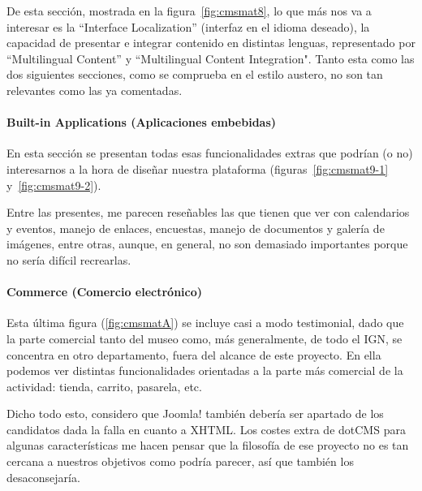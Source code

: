 \par De esta sección, mostrada en la figura~\ref{fig:cmsmat8}, lo que más nos va a interesar es la ``Interface Localization'' (interfaz en el idioma deseado), la capacidad de presentar e integrar contenido en distintas lenguas, representado por ``Multilingual Content'' y ``Multilingual Content Integration". Tanto esta como las dos siguientes secciones, como se comprueba en el estilo austero, no son tan relevantes como las ya comentadas.



\paragraph{Built-in Applications (Aplicaciones embebidas)}


\par En esta sección se presentan todas esas funcionalidades extras que podrían (o no) interesarnos a la hora de diseñar nuestra plataforma (figuras~\ref{fig:cmsmat9-1} y~\ref{fig:cmsmat9-2}).


\par Entre las presentes, me parecen reseñables las que tienen que ver con calendarios y eventos, manejo de enlaces, encuestas, manejo de documentos y galería de imágenes, entre otras, aunque, en general, no son demasiado importantes porque no sería difícil recrearlas.


\paragraph{Commerce (Comercio electrónico)}


\par Esta última figura (\ref{fig:cmsmatA}) se incluye casi a modo testimonial, dado que la parte comercial tanto del museo como, más generalmente, de todo el IGN, se concentra en otro departamento, fuera del alcance de este proyecto. En ella podemos ver distintas funcionalidades orientadas a la parte más comercial de la actividad: tienda, carrito, pasarela, etc.


\par Dicho todo esto, considero que Joomla! también debería ser apartado de los candidatos dada la falla en cuanto a XHTML. Los costes extra de dotCMS para algunas características me hacen pensar que la filosofía de ese proyecto no es tan cercana a nuestros objetivos como podría parecer, así que también los desaconsejaría.



